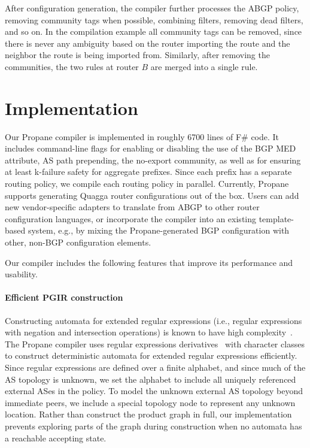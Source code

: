 \documentclass[10pt]{sigalternate052015}
\newcommand{\sysname}{{\small \sf Propane}\xspace}
\newcommand{\para}[1]{\paragraph*{\textbf{#1}}}
\begin{document}
After configuration generation, the compiler further processes the ABGP policy, removing community tags when possible, combining filters, removing dead filters, and so on. In the compilation example all community tags can be removed, since there is never any ambiguity based on the router importing the route and the neighbor the route is being imported from. Similarly, after removing the communities, the two rules at router $B$ are merged into a single rule.



%
%
%
%



\section{Implementation}
\label{sec:implementation}

Our \sysname compiler is implemented in roughly 6700 lines of F\# code. It includes command-line flags for enabling or disabling the use of the BGP MED attribute, AS path prepending, the no-export community, as well as for ensuring at least k-failure safety for aggregate prefixes. Since each prefix has a separate routing policy, we compile each routing policy in parallel. Currently, \sysname supports generating Quagga router configurations out of the box. Users can add new vendor-specific adapters to translate from ABGP to other router configuration languages, or incorporate the compiler into an existing template-based system, e.g., by mixing the \sysname-generated BGP configuration with other, non-BGP configuration elements.

Our compiler includes the following features that improve its performance and usability.

\para{Efficient PGIR construction}

Constructing automata for extended regular expressions (i.e., regular expressions with negation and intersection operations) is known to have high complexity~\cite{regex-complexity}. The \sysname compiler uses regular expressions derivatives~\cite{regex-derivatives} with character classes to construct deterministic automata for extended regular expressions efficiently. Since regular expressions are defined over a finite alphabet, and since much of the AS topology is unknown, we set the alphabet to include all uniquely referenced external ASes in the policy. To model the unknown external AS topology beyond immediate peers, we include a special topology node to represent any unknown location.
%
Rather than construct the product graph in full, our implementation prevents exploring parts of the graph during construction when no automata has a reachable accepting state.
\end{document}
